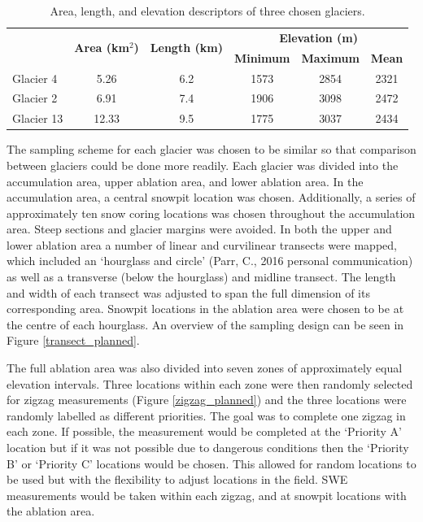 \documentclass[12pt]{article}
\begin{document}
\begin{table}[b!]
\centering
\caption{Area, length, and elevation descriptors of three chosen glaciers.}
\label{glacierstats}
\begin{tabular}{|l|c|c|ccc|}
\hline
\multicolumn{1}{|c|}{} & \multirow{2}{*}{\textbf{Area (km$^2$)}} & \multirow{2}{*}{\textbf{Length (km)}} & \multicolumn{3}{c|}{\textbf{Elevation (m)}}         \\
\multicolumn{1}{|c|}{} &                                         &                                       & \textbf{Minimum} & \textbf{Maximum} & \textbf{Mean} \\ \hline
Glacier 4              & 5.26                                    & 6.2                                   & 1573             & 2854             & 2321          \\
Glacier 2              & 6.91                                    & 7.4                                   & 1906             & 3098             & 2472          \\
Glacier 13             & 12.33                                   & 9.5                                   & 1775             & 3037             & 2434          \\ \hline
\end{tabular}
\end{table} 

The sampling scheme for each glacier was chosen to be similar so that comparison between glaciers could be done more readily. Each glacier was divided into the accumulation area, upper ablation area, and lower ablation area. In the accumulation area, a central snowpit location was chosen. Additionally, a series of approximately ten snow coring locations was chosen throughout the accumulation area. Steep sections and glacier margins were avoided. In both the upper and lower ablation area a number of linear and curvilinear transects were mapped, which included an `hourglass and circle' (Parr, C., 2016 personal communication) as well as a transverse (below the hourglass) and midline transect. The length and width of each transect was adjusted to span the full dimension of its corresponding area. Snowpit locations in the ablation area were chosen to be at the centre of each hourglass. An overview of the sampling design can be seen in Figure \ref{transect_planned}.

The full ablation area was also divided into seven zones of approximately equal elevation intervals. Three locations within each zone were then randomly selected for zigzag \citep{Shea2010} measurements (Figure \ref{zigzag_planned}) and the three locations were randomly labelled as different priorities. The goal was to complete one zigzag in each zone. If possible, the measurement would be completed at the `Priority A' location but if it was not possible due to dangerous conditions then the `Priority B' or `Priority C' locations would be chosen. This allowed for random locations to be used but with the flexibility to adjust locations in the field. SWE measurements would be taken within each zigzag, and at snowpit locations with the ablation area.  
\end{document}
